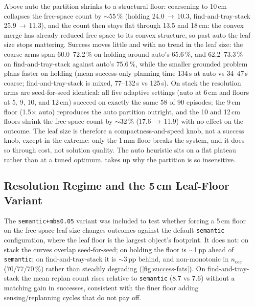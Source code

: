 Above auto the partition shrinks to a structural floor: coarsening to 10\,cm collapses the free-space count by $\sim$55\,\% (holding 24.0\,$\to$\,10.3, find-and-tray-stack 25.9\,$\to$\,11.3), and the count then stays flat through 13.5 and 18\,cm: the convex merge has already reduced free space to its convex structure, so past auto the leaf size stops mattering. Success moves little and with no trend in the leaf size: the coarse arms span 60.0--72.2\,\% on holding around auto's 65.6\,\%, and 62.2--73.3\,\% on find-and-tray-stack against auto's 75.6\,\%, while the smaller grounded problem plans faster on holding (mean success-only planning time 134\,s at auto vs 34--47\,s coarse; find-and-tray-stack is mixed, 77--132\,s vs 125\,s). On stack the resolution arms are seed-for-seed identical: all five adaptive settings (auto at 6\,cm and floors at 5, 9, 10, and 12\,cm) succeed on exactly the same 58 of 90 episodes; the 9\,cm floor (1.5$\times$ auto) reproduces the auto partition outright, and the 10 and 12\,cm floors shrink the free-space count by $\sim$32\,\% (17.6\,$\to$\,11.9) with no effect on the outcome. The leaf size is therefore a compactness-and-speed knob, not a success knob, except in the extreme: only the 1\,mm floor breaks the system, and it does so through cost, not solution quality. The auto heuristic sits on a flat plateau rather than at a tuned optimum.  takes up why the partition is so insensitive.

\subsection{Resolution Regime and the 5\,cm Leaf-Floor Variant}
\label{sec:disc-mbs0}

The \texttt{semantic+mbs0.05} variant was included to test whether
forcing a 5\,cm floor on the free-space leaf size changes outcomes
against the default \texttt{semantic} configuration, where the leaf
floor is the largest object's footprint. It does not: on stack the
curves overlap seed-for-seed; on holding the floor is $\sim$1\,pp ahead
of \texttt{semantic}; on find-and-tray-stack it is $\sim$3\,pp behind,
and non-monotonic in $n_\text{occ}$ (70/77/70\,\%) rather than steadily degrading
(\cref{fig:success-fats}). On find-and-tray-stack the mean replan count rises relative to \texttt{semantic} (8.7 vs 7.6) without a matching gain in successes, consistent with the finer floor adding sensing/replanning cycles that do not pay off.

